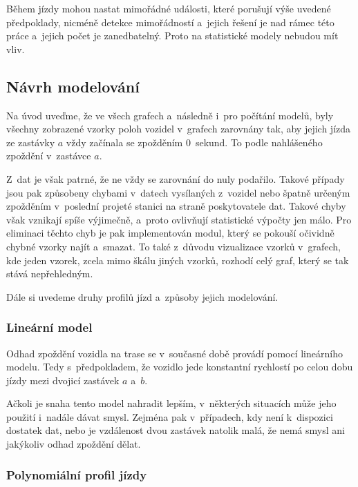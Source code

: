 \bigbreak

Během jízdy mohou nastat mimořádné události, které porušují výše uvedené předpoklady, nicméně detekce mimořádností a~jejich řešení je nad rámec této práce a~jejich počet je zanedbatelný. Proto na statistické modely nebudou mít vliv.


\subsection{Návrh modelování} \label{subsubsection:analyza_dat}

Na úvod uveďme, že ve všech grafech a~následně i~pro počítání modelů, byly všechny zobrazené vzorky poloh vozidel v~grafech zarovnány tak, aby jejich jízda ze zastávky $a$ vždy začínala se zpožděním 0~sekund. To podle nahlášeného zpoždění v~zastávce $a$.


\bigbreak

Z~dat je však patrné, že ne vždy se zarovnání do nuly podařilo. Takové případy jsou pak způsobeny chybami v~datech vysílaných z~vozidel nebo špatně určeným zpožděním v~poslední projeté stanici na straně poskytovatele dat. Takové chyby však vznikají spíše výjimečně, a~proto ovlivňují statistické výpočty jen málo. Pro eliminaci těchto chyb je pak implementován modul, který se pokouší očividně chybné vzorky najít a~smazat. To také z~důvodu vizualizace vzorků v~grafech, kde jeden vzorek, zcela mimo škálu jiných vzorků, rozhodí celý graf, který se tak stává nepřehledným.


\bigbreak

Dále si uvedeme druhy profilů jízd a~způsoby jejich modelování.


\subsubsection{Lineární model}

Odhad zpoždění vozidla na trase se v~současné době provádí pomocí lineárního modelu. Tedy s~předpokladem, že vozidlo jede konstantní rychlostí po celou dobu jízdy mezi dvojicí zastávek $a$ a~$b$.


\bigbreak

Ačkoli je snaha tento model nahradit lepším, v~některých situacích může jeho použití i~nadále dávat smysl. Zejména pak v~případech, kdy není k~dispozici dostatek dat, nebo je vzdálenost dvou zastávek natolik malá, že nemá smysl ani jakýkoliv odhad zpoždění dělat.


\subsubsection{Polynomiální profil jízdy}

